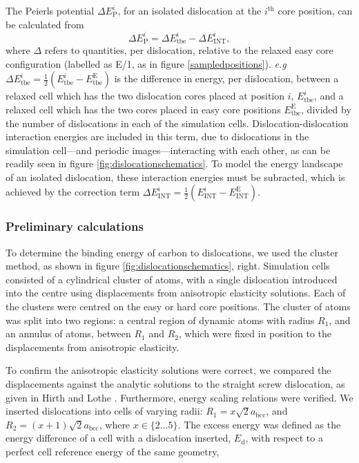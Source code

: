 \documentclass[a4paper,11pt]{article}
\numberwithin{equation}{chapter}
\numberwithin{listing}{chapter}
\begin{document}
The Peierls potential \(\Delta E_{\text{P}}^i\), for an isolated dislocation at the \(i^{\text{th}}\) core
position, can be calculated from
\begin{equation}
 \Delta E_{\text{P}}^i = \Delta E_{\text{tbe}}^{i} - \Delta E_{\text{INT}}^{i} ,\label{eq:peierlspot}
 \end{equation}
where \(\Delta\) refers to quantities, per dislocation, relative to the relaxed easy core configuration
(labelled as E/1, as in figure \ref{sampledpositions}). \emph{e.g} \(\Delta E_{\text{tbe}}^{i} = \frac{1}{2} (
   E_{\text{tbe}}^{i} - E_{\text{tbe}}^{\text{E}} )\) is the difference in energy, per dislocation, between
a relaxed cell which has the two dislocation cores placed at position \(i\), \(E_{\text{tbe}}^{i}\), and a relaxed
cell which has the two cores placed in easy core positions \(E_{\text{tbe}}^{\text{E}}\), divided by the number of
dislocations in each of the simulation cells. Dislocation-dislocation interaction
energies are included in this term, due to dislocations in the simulation cell---and
periodic images---interacting with each other, as can be readily seen in figure
\ref{fig:dislocationschematics}. To model the energy landscape of an isolated dislocation, these
interaction energies must be subracted, which is achieved by the correction term \(\Delta E_{\text{INT}}^{i}
   = \frac{1}{2} ( E_{\text{INT}}^{i} - E_{\text{INT}}^{\text{E}} )\).

\subsubsection{Preliminary calculations}
\label{sec:org753edcb}

To determine the binding energy of carbon to dislocations, we used the cluster method, as shown
in figure \ref{fig:dislocationschematics}, right. Simulation
cells consisted of a cylindrical cluster of atoms, with a single dislocation introduced into the
centre using displacements from anisotropic elasticity solutions. Each of the clusters were
centred on the easy or hard core positions. The cluster of atoms was split into two regions: a
central region of dynamic atoms with radius \(R_1\), and an annulus of atoms, between \(R_1\) and \(R_2\),
which were fixed in position to the displacements from anisotropic elasticity.


To confirm the anisotropic elasticity solutions were correct, we compared the
displacements against the analytic solutions to the straight screw dislocation, as given in Hirth
and Lothe \cite{Anderson2017}. Furthermore, energy scaling relations were verified. We
inserted dislocations into cells of varying radii: \(R_1 = x\sqrt{2}a_{\text{bcc}}\), and \(R_2 =
   (x+1)\sqrt{2}a_{\text{bcc}}\), where \(x \in \{2\dots5\}\). The excess energy
was defined as the energy difference of a cell with a dislocation inserted, \(E_{\text{d}}\), with
respect to a perfect cell reference energy of the same geometry,
\end{document}
